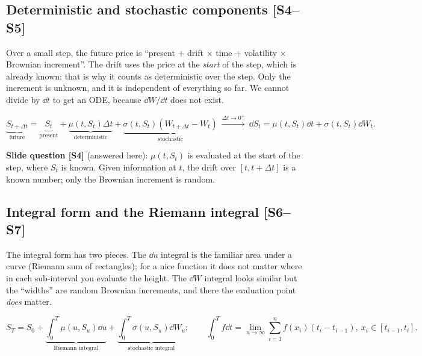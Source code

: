 \documentclass[10pt]{article}
\begin{document}
\subsection{Deterministic and stochastic components [S4--S5]}
\begin{idea}
Over a small step, the future price is ``present $+$ drift $\times$ time $+$ volatility $\times$ Brownian increment''. The drift uses the price at the \emph{start} of the step, which is already known: that is why it counts as deterministic over the step. Only the increment is unknown, and it is independent of everything so far. We cannot divide by $\dd t$ to get an ODE, because $\dd W/\dd t$ does not exist.
\end{idea}
\[\underbrace{S_{t+\Delta t}}_{\text{future}}=\underbrace{S_t}_{\text{present}}+\underbrace{\mu(t,S_t)\Delta t}_{\text{deterministic}}+\underbrace{\sigma(t,S_t)(W_{t+\Delta t}-W_t)}_{\text{stochastic}}\ \xrightarrow{\Delta t\to0^+}\ \dd S_t=\mu(t,S_t)\dd t+\sigma(t,S_t)\dd W_t.\]
\begin{where}
\end{where}
\textbf{Slide question [S4]} (answered here): $\mu(t,S_t)$ is evaluated at the start of the step, where $S_t$ is known. Given information at $t$, the drift over $[t,t+\Delta t]$ is a known number; only the Brownian increment is random.

\subsection{Integral form and the Riemann integral [S6--S7]}
\begin{idea}
The integral form has two pieces. The $\dd u$ integral is the familiar area under a curve (Riemann sum of rectangles); for a nice function it does not matter where in each sub-interval you evaluate the height. The $\dd W$ integral looks similar but the ``widths'' are random Brownian increments, and there the evaluation point \emph{does} matter.
\end{idea}
\[S_T=S_0+\underbrace{\int_0^T\mu(u,S_u)\dd u}_{\text{Riemann integral}}+\underbrace{\int_0^T\sigma(u,S_u)\dd W_u}_{\text{stochastic integral}};\qquad \int_0^Tf\dd t=\lim_{n\to\infty}\sum_{i=1}^nf(x_i)(t_i-t_{i-1}),\ x_i\in[t_{i-1},t_i].\]
\begin{where}
\end{where}
\end{document}
